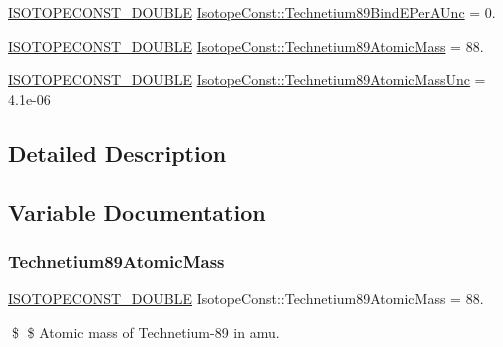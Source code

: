 \begin{DoxyCompactItemize}
\mbox{\hyperlink{group___isotope_const-_macros_ga8f45a7272ce02c0b4c65c44636ed719a}{I\+S\+O\+T\+O\+P\+E\+C\+O\+N\+S\+T\+\_\+\+D\+O\+U\+B\+LE}} \mbox{\hyperlink{group___isotope_const-_technetium-_tc89_ga7666ecddd52bdf0ff2d2c93c3def1994}{Isotope\+Const\+::\+Technetium89\+Bind\+E\+Per\+A\+Unc}} = 0.
\item 
\mbox{\hyperlink{group___isotope_const-_macros_ga8f45a7272ce02c0b4c65c44636ed719a}{I\+S\+O\+T\+O\+P\+E\+C\+O\+N\+S\+T\+\_\+\+D\+O\+U\+B\+LE}} \mbox{\hyperlink{group___isotope_const-_technetium-_tc89_ga3f88d1fc78f4e814c9e11c448c8f1fe4}{Isotope\+Const\+::\+Technetium89\+Atomic\+Mass}} = 88.
\item 
\mbox{\hyperlink{group___isotope_const-_macros_ga8f45a7272ce02c0b4c65c44636ed719a}{I\+S\+O\+T\+O\+P\+E\+C\+O\+N\+S\+T\+\_\+\+D\+O\+U\+B\+LE}} \mbox{\hyperlink{group___isotope_const-_technetium-_tc89_gaaedb7668faa2a335acfae586965c5576}{Isotope\+Const\+::\+Technetium89\+Atomic\+Mass\+Unc}} = 4.\+1e-\/06
\end{DoxyCompactItemize}


\subsection{Detailed Description}


\subsection{Variable Documentation}
\mbox{\label{group___isotope_const-_technetium-_tc89_ga3f88d1fc78f4e814c9e11c448c8f1fe4}} 
\subsubsection{\texorpdfstring{Technetium89\+Atomic\+Mass}{Technetium89AtomicMass}}
{\footnotesize\ttfamily \mbox{\hyperlink{group___isotope_const-_macros_ga8f45a7272ce02c0b4c65c44636ed719a}{I\+S\+O\+T\+O\+P\+E\+C\+O\+N\+S\+T\+\_\+\+D\+O\+U\+B\+LE}} Isotope\+Const\+::\+Technetium89\+Atomic\+Mass = 88.}

\$ \$ Atomic mass of Technetium-\/89 in amu. \mbox{\label{group___isotope_const-_technetium-_tc89_gaaedb7668faa2a335acfae586965c5576}} 
